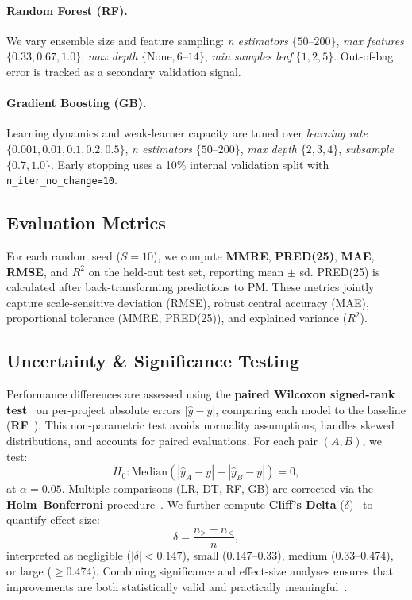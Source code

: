 \documentclass[11pt,a4paper]{article}
\begin{document}
\paragraph{Random Forest (RF).}
We vary ensemble size and feature sampling:  
\emph{n estimators} $\{50$–$200\}$,  
\emph{max features} $\{0.33,0.67,1.0\}$,  
\emph{max depth} $\{\text{None},6$–$14\}$,  
\emph{min samples leaf} $\{1,2,5\}$.  
Out-of-bag error is tracked as a secondary validation signal.

\paragraph{Gradient Boosting (GB).}
Learning dynamics and weak-learner capacity are tuned over  
\emph{learning rate} $\{0.001,0.01,0.1,0.2,0.5\}$,  
\emph{n estimators} $\{50$–$200\}$,  
\emph{max depth} $\{2,3,4\}$,  
\emph{subsample} $\{0.7,1.0\}$.  
Early stopping uses a 10\% internal validation split with 
\texttt{n\_iter\_no\_change=10}.

\subsection{Evaluation Metrics}
For each random seed ($S{=}10$), 
we compute \textbf{MMRE}, \textbf{PRED(25)}, \textbf{MAE}, \textbf{RMSE}, 
and \textbf{$R^2$} on the held-out test set, reporting mean $\pm$ sd.  
PRED(25) is calculated after back-transforming predictions to PM.  
These metrics jointly capture scale-sensitive deviation (RMSE), 
robust central accuracy (MAE), proportional tolerance (MMRE, PRED(25)), 
and explained variance ($R^2$).

\subsection{Uncertainty \& Significance Testing}
Performance differences are assessed using the 
\textbf{paired Wilcoxon signed-rank test}~\cite{wilcoxon1945individual} 
on per-project absolute errors $|\hat{y}-y|$, 
comparing each model to the baseline (\textbf{RF}~\cite{breiman2001random}).  
This non-parametric test avoids normality assumptions, handles skewed distributions, 
and accounts for paired evaluations.  
For each pair $(A,B)$, we test:
\[
H_0:\mathrm{Median}(|\hat{y}_A{-}y|-|\hat{y}_B{-}y|)=0,
\]
at $\alpha=0.05$.  
Multiple comparisons (LR, DT, RF, GB) are corrected via 
the \textbf{Holm–Bonferroni} procedure~\cite{holm1979simple}.  
We further compute \textbf{Cliff’s Delta} ($\delta$)~\cite{macbeth2011cliffs} 
to quantify effect size:
\[
\delta=\frac{n_{>}-n_{<}}{n},
\]
interpreted as negligible ($|\delta|<0.147$), small (0.147–0.33), 
medium (0.33–0.474), or large ($\ge0.474$).  
Combining significance and effect-size analyses ensures 
that improvements are both statistically valid and practically meaningful~\cite{demvsar2006statistical,garcia2010advanced}.
\end{document}
